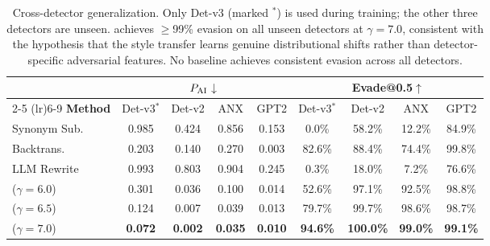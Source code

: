 \begin{table}[t]
\centering
\small
\begin{tabular}{l cccc cccc}
\toprule
& \multicolumn{4}{c}{\textbf{$P_{\text{AI}}$$\downarrow$}} & \multicolumn{4}{c}{\textbf{Evade@0.5$\uparrow$}} \\
\cmidrule(lr){2-5} \cmidrule(lr){6-9}
\textbf{Method} & Det-v3$^*$ & Det-v2 & ANX & GPT2 & Det-v3$^*$ & Det-v2 & ANX & GPT2 \\
\midrule
Synonym Sub. & 0.985 & 0.424 & 0.856 & 0.153 & 0.0\% & 58.2\% & 12.2\% & 84.9\% \\
Backtrans. & 0.203 & 0.140 & 0.270 & 0.003 & 82.6\% & 88.4\% & 74.4\% & 99.8\% \\
LLM Rewrite & 0.993 & 0.803 & 0.904 & 0.245 & 0.3\% & 18.0\% & 7.2\% & 76.6\% \\
\midrule
\styleshield{} ($\gamma{=}6.0$) & 0.301 & 0.036 & 0.100 & 0.014 & 52.6\% & 97.1\% & 92.5\% & 98.8\% \\
\styleshield{} ($\gamma{=}6.5$) & 0.124 & 0.007 & 0.039 & 0.013 & 79.7\% & 99.7\% & 98.6\% & 98.7\% \\
\styleshield{} ($\gamma{=}7.0$) & \textbf{0.072} & \textbf{0.002} & \textbf{0.035} & \textbf{0.010} & \textbf{94.6\%} & \textbf{100.0\%} & \textbf{99.0\%} & \textbf{99.1\%} \\
\bottomrule
\end{tabular}
\caption{Cross-detector generalization. Only Det-v3 (marked $^*$) is used during training; the other three detectors are unseen. \styleshield{} achieves $\geq$99\% evasion on all unseen detectors at $\gamma{=}7.0$, consistent with the hypothesis that the style transfer learns genuine distributional shifts rather than detector-specific adversarial features. No baseline achieves consistent evasion across all detectors.}
\label{tab:cross_detector}
\end{table}
